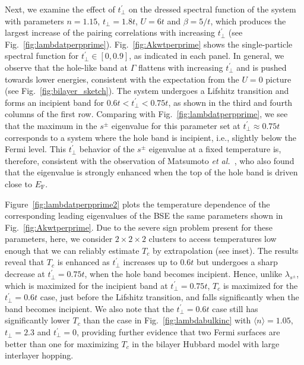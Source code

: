 \documentclass[prb,twocolumn,amsmath,amssymb,superscriptaddress,floatfix,nofootinbib]{revtex4-2}
\begin{document}
Next, we examine the effect of $t_\perp^{\prime}$ on the dressed spectral function of the system with parameters $n=1.15$, $t_\perp=1.8t$, $U=6t$ and $\beta=5/t$, which produces the largest increase of the pairing correlations with increasing $t_\perp^{\prime}$ (see Fig.~\ref{fig:lambdatperpprime}).  Fig.~\ref{fig:Akwtperprime} shows the single-particle spectral function for $t_\perp^{\prime} \in [0,0.9]$, as indicated in each panel. In general, we observe that the hole-like band at $\Gamma$ flattens with increasing $t^\prime_\perp$ and is pushed towards lower energies, consistent with the expectation from the $U=0$ picture (see Fig.~\ref{fig:bilayer_sketch}). The system undergoes a Lifshitz transition and forms an incipient band for $0.6t < t_\perp^{\prime} <0.75t$, as shown in the third and fourth columns of the first row. Comparing with Fig.~\ref{fig:lambdatperpprime}, we see that the maximum in the $s^\pm$ eigenvalue for this parameter set at $t_\perp^\prime \approx 0.75t$ corresponds to a system where the hole band is incipient, i.e., slightly below the Fermi level. This $t_\perp^\prime$ behavior of the $s^\pm$ eigenvalue at a fixed temperature is, therefore, consistent with the observation of Matsumoto {\it et al.}~\cite{KurokiFlex2020}, who also found that the eigenvalue is strongly enhanced when the top of the hole band is driven close to $E_\mathrm{F}$. 

Figure~\ref{fig:lambdatperpprime2} plots the temperature dependence of the corresponding leading eigenvalues of the BSE the same parameters shown in Fig.~\ref{fig:Akwtperprime}. Due to the severe sign problem present for these parameters, here, we consider $2\times 2\times 2$ clusters to access temperatures low enough that we can reliably estimate $T_c$ by extrapolation (see inset). The results reveal that $T_c$ is enhanced as $t_\perp^{\prime}$ increases up to $0.6t$ but undergoes a sharp decrease at $t_\perp^{\prime} = 0.75t$, when the hole band becomes incipient. Hence, unlike $\lambda_{s^\pm}$, which is maximized for the incipient band at $t_\perp^\prime=0.75t$, $T_c$ is maximized for the $t_\perp^\prime=0.6t$ case, just before the Lifshitz transition, and falls significantly when the band becomes incipient. We also note that the $t_\perp^\prime=0.6t$ case still has significantly lower $T_c$ than the case in Fig.~\ref{fig:lambdabulkinc} with $\langle n\rangle=1.05$, $t^{\phantom\prime}_\perp=2.3$ and $t_\perp^\prime=0$, providing further evidence that two Fermi surfaces are better than one for maximizing $T_c$ in the bilayer Hubbard model with large interlayer hopping. 
\end{document}
